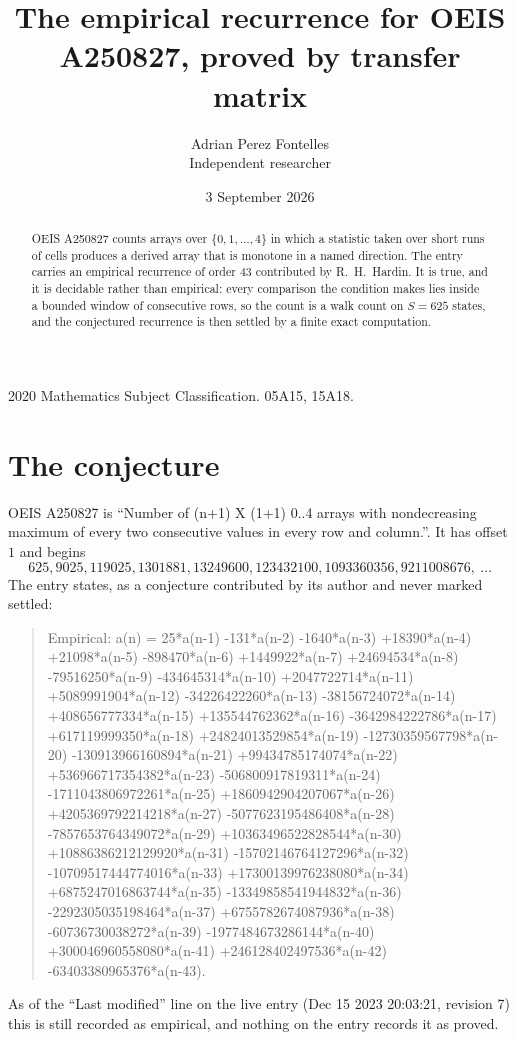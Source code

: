 \documentclass[11pt,a4paper]{article}
\title{The empirical recurrence for OEIS A250827, proved by transfer matrix}
\author{Adrian Perez Fontelles\\ \small Independent researcher}
\date{3 September 2026}
\theoremstyle{plain}
\theoremstyle{definition}
\begin{document}
\maketitle

\begin{abstract}
OEIS A250827 counts arrays over $\{0,1,\dots,4\}$ in which a statistic taken over short runs
of cells produces a derived array that is monotone in a named direction. The entry carries an
empirical recurrence of order $43$ contributed by R.~H.~Hardin. It is true, and it is
decidable rather than empirical: every comparison the condition makes lies inside a bounded
window of consecutive rows, so the count is a walk count on $S=625$ states, and the
conjectured recurrence is then settled by a finite exact computation.
\end{abstract}

\noindent\small 2020 Mathematics Subject Classification. 05A15, 15A18.\normalsize

\section{The conjecture}

OEIS A250827 is ``Number of (n+1) X (1+1) 0..4 arrays with nondecreasing maximum of every two consecutive values in every row and column.''. It has offset $1$ and begins
\[
625, 9025, 119025, 1301881, 13249600, 123432100, 1093360356, 9211008676,\ \dots
\]
The entry states, as a conjecture contributed by its author and never marked settled:
\begin{quote}
Empirical: a(n) = 25*a(n-1) -131*a(n-2) -1640*a(n-3) +18390*a(n-4) +21098*a(n-5) -898470*a(n-6) +1449922*a(n-7) +24694534*a(n-8) -79516250*a(n-9) -434645314*a(n-10) +2047722714*a(n-11) +5089991904*a(n-12) -34226422260*a(n-13) -38156724072*a(n-14) +408656777334*a(n-15) +135544762362*a(n-16) -3642984222786*a(n-17) +617119999350*a(n-18) +24824013529854*a(n-19) -12730359567798*a(n-20) -130913966160894*a(n-21) +99434785174074*a(n-22) +536966717354382*a(n-23) -506800917819311*a(n-24) -1711043806972261*a(n-25) +1860942904207067*a(n-26) +4205369792214218*a(n-27) -5077623195486408*a(n-28) -7857653764349072*a(n-29) +10363496522828544*a(n-30) +10886386212129920*a(n-31) -15702146764127296*a(n-32) -10709517444774016*a(n-33) +17300139976238080*a(n-34) +6875247016863744*a(n-35) -13349858541944832*a(n-36) -2292305035198464*a(n-37) +6755782674087936*a(n-38) -60736730038272*a(n-39) -1977484673286144*a(n-40) +300046960558080*a(n-41) +246128402497536*a(n-42) -63403380965376*a(n-43).
\end{quote}
As of the ``Last modified'' line on the live entry (Dec 15 2023 20:03:21, revision 7) this is still
recorded as empirical, and nothing on the entry records it as proved.
\end{document}
